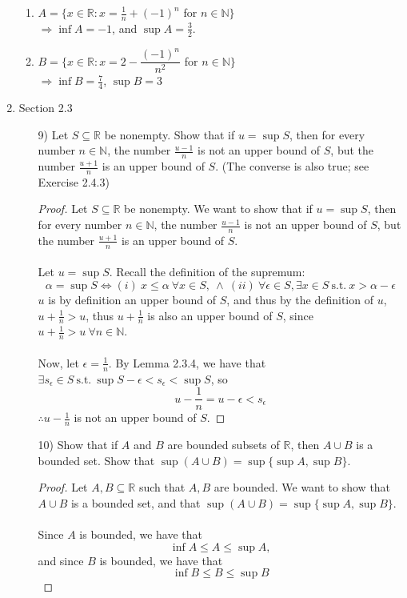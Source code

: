 \documentclass[12pt,letterpaper]{article}
\theoremstyle{case}
\begin{document}
\begin{enumerate}
\begin{enumerate}
			\item $A=\{x \in \mathbb{R}: x = \frac{1}{n} + (-1)^n$ for $n \in \mathbb{N}\}$
			\\ $\Rightarrow \inf A = -1$, and $\sup A = \frac{3}{2}$.
			\item $B = \{x \in \mathbb{R}: x = 2 - \dfrac{(-1)^n}{n^2}$ for $n \in \mathbb{N}\}$
			\\ $\Rightarrow \inf B = \frac{7}{4}$, $\sup B = 3$
		\end{enumerate}
	\item Section 2.3
	\begin{enumerate}
		\item[9)] Let $S \subseteq \mathbb{R}$ be nonempty. Show that if $u = \sup S$, then for every number $n \in \mathbb{N}$, the number $\frac{u-1}{n}$ is not an upper bound of $S$, but the number $\frac{u+1}{n}$ is an upper bound of $S$. (The converse is also true; see Exercise 2.4.3)
		\begin{proof}
			Let $S \subseteq \mathbb{R}$ be nonempty. We want to show that if $u = \sup S$, then for every number $n \in \mathbb{N}$, the number $\frac{u-1}{n}$ is not an upper bound of $S$, but the number $\frac{u+1}{n}$ is an upper bound of $S$.
			\\\\Let $u = \sup S$. Recall the definition of the supremum:
			$$\alpha = \sup S \iff (i)\ x \leq \alpha\  \forall x \in S,\ \wedge\ (ii)\ \forall \epsilon \in S, \exists x \in S\  \text{s.t.}\  x > \alpha - \epsilon$$
			$u$ is by definition an upper bound of $S$, and thus by the definition of $u$, $u+ \frac{1}{n}>u$, thus $u +\frac{1}{n}$ is also an upper bound of $S$, since $u+\frac{1}{n} > u\  \forall n \in \mathbb{N}$.
			\\\\ Now, let $\epsilon = \frac{1}{n}$. By Lemma 2.3.4, we have that $\exists s_\epsilon \in S\ \text{s.t.}\ \sup S - \epsilon < s_\epsilon < \sup S$, so
			$$u-\frac{1}{n} = u-\epsilon < s_\epsilon$$
			$\therefore u-\frac{1}{n}$ is not an upper bound of $S$.
		\end{proof}
		\item[10)] Show that if $A$ and $B$ are bounded subsets of $\mathbb{R}$, then $A \cup B$ is a bounded set. Show that $\sup(A \cup B) = \sup \{\sup A, \sup B\}$.
		\begin{proof}
			Let $A, B \subseteq \mathbb{R}$ such that $A, B$ are bounded. We want to show that $A \cup B$ is a bounded set, and that $\sup(A \cup B) = \sup\{\sup A, \sup B\}$.
			\\\\Since $A$ is bounded, we have that $$\inf A \leq A \leq \sup A,$$ and since $B$ is bounded, we have that $$\inf B \leq B \leq \sup B$$

\end{proof}
\end{enumerate}
\end{enumerate}
\end{document}
